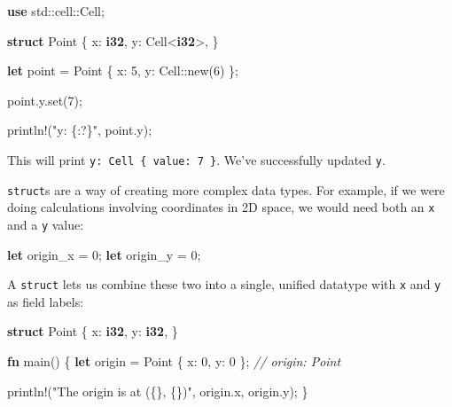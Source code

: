 \documentclass[a4paper,]{book}
\newenvironment{Shaded}{\begin{snugshade}}{\end{snugshade}}
\newcommand{\KeywordTok}[1]{\textcolor[rgb]{0.13,0.29,0.53}{\textbf{{#1}}}}
\newcommand{\DecValTok}[1]{\textcolor[rgb]{0.00,0.00,0.81}{{#1}}}
\newcommand{\StringTok}[1]{\textcolor[rgb]{0.31,0.60,0.02}{{#1}}}
\newcommand{\CommentTok}[1]{\textcolor[rgb]{0.56,0.35,0.01}{\textit{{#1}}}}
\newcommand{\OtherTok}[1]{\textcolor[rgb]{0.56,0.35,0.01}{{#1}}}
\newcommand{\NormalTok}[1]{{#1}}
\begin{document}
\begin{Shaded}
\begin{Highlighting}[]
\KeywordTok{use} \NormalTok{std::cell::Cell;}

\KeywordTok{struct} \NormalTok{Point \{}
    \NormalTok{x: }\KeywordTok{i32}\NormalTok{,}
    \NormalTok{y: Cell<}\KeywordTok{i32}\NormalTok{>,}
\NormalTok{\}}

\KeywordTok{let} \NormalTok{point = Point \{ x: }\DecValTok{5}\NormalTok{, y: Cell::new(}\DecValTok{6}\NormalTok{) \};}

\NormalTok{point.y.set(}\DecValTok{7}\NormalTok{);}

\OtherTok{println!}\NormalTok{(}\StringTok{"y: \{:?\}"}\NormalTok{, point.y);}
\end{Highlighting}
\end{Shaded}

This will print \texttt{y:\ Cell\ \{\ value:\ 7\ \}}. We've successfully
updated \texttt{y}.


\texttt{struct}s are a way of creating more complex data types. For
example, if we were doing calculations involving coordinates in 2D
space, we would need both an \texttt{x} and a \texttt{y} value:

\begin{Shaded}
\begin{Highlighting}[]
\KeywordTok{let} \NormalTok{origin_x = }\DecValTok{0}\NormalTok{;}
\KeywordTok{let} \NormalTok{origin_y = }\DecValTok{0}\NormalTok{;}
\end{Highlighting}
\end{Shaded}

A \texttt{struct} lets us combine these two into a single, unified
datatype with \texttt{x} and \texttt{y} as field labels:

\begin{Shaded}
\begin{Highlighting}[]
\KeywordTok{struct} \NormalTok{Point \{}
    \NormalTok{x: }\KeywordTok{i32}\NormalTok{,}
    \NormalTok{y: }\KeywordTok{i32}\NormalTok{,}
\NormalTok{\}}

\KeywordTok{fn} \NormalTok{main() \{}
    \KeywordTok{let} \NormalTok{origin = Point \{ x: }\DecValTok{0}\NormalTok{, y: }\DecValTok{0} \NormalTok{\}; }\CommentTok{// origin: Point}

    \OtherTok{println!}\NormalTok{(}\StringTok{"The origin is at (\{\}, \{\})"}\NormalTok{, origin.x, origin.y);}
\NormalTok{\}}
\end{Highlighting}
\end{Shaded}
\end{document}
